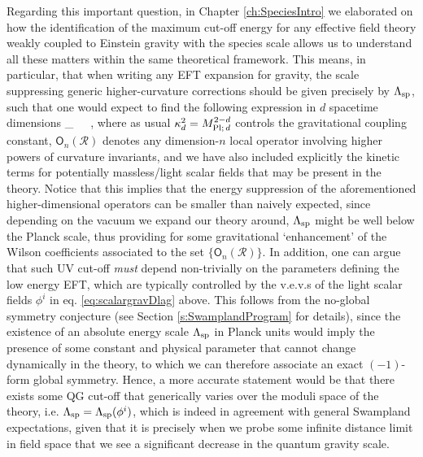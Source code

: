 Regarding this important question, in Chapter \ref{ch:SpeciesIntro} we elaborated on how the identification of the maximum cut-off energy for any effective field theory weakly coupled to Einstein gravity with the species scale allows us to understand all these matters within the same theoretical framework. This means, in particular, that when writing any EFT expansion for gravity, the scale suppressing generic higher-curvature corrections should be given precisely by $\Lambda_{\text{sp}}$, such that one would expect to find the following expression in $d$ spacetime dimensions
%
\beq
{}_{}\, \supset\,  \, ,
\label{eq:scalargravDlag}
\eeq
%
where as usual $\kappa_d^{2} =M_{\text{Pl;}\, d}^{2-d}$ controls the gravitational coupling constant, $\mathsf{O}_n (\mathcal{R})$ denotes any dimension-$n$ local operator involving higher powers of curvature invariants, and we have also included explicitly the kinetic terms for potentially massless/light scalar fields that may be present in the theory. Notice that this implies that the energy suppression of the aforementioned higher-dimensional operators can be smaller than naively expected, since depending on the vacuum we expand our theory around, $\Lambda_{\text{sp}}$ might be well below the Planck scale, thus providing for some gravitational `enhancement' of the Wilson coefficients associated to the set $\{ \mathsf{O}_n (\mathcal{R})\}$. In addition, one can argue that such UV cut-off \emph{must} depend non-trivially on the parameters defining the low energy EFT, which are typically controlled by the v.e.v.s of the light scalar fields $\phi^i$ in eq. \eqref{eq:scalargravDlag} above. This follows from the no-global symmetry conjecture (see Section \ref{s:SwamplandProgram} for details), since the existence of an absolute energy scale $\Lambda_{\text{sp}}$ in Planck units would imply the presence of some constant and physical parameter that cannot change dynamically in the theory, to which we can therefore associate an exact $(-1)$-form global symmetry. Hence, a more accurate statement would be that there exists some QG cut-off that generically varies over the moduli space of the theory, i.e. $\Lambda_{\text{sp}}= \Lambda_{\text{sp}} (\phi^i)$, which is indeed in agreement with general Swampland expectations, given that it is precisely when we probe some infinite distance limit in field space that we see a significant decrease in the quantum gravity scale.

